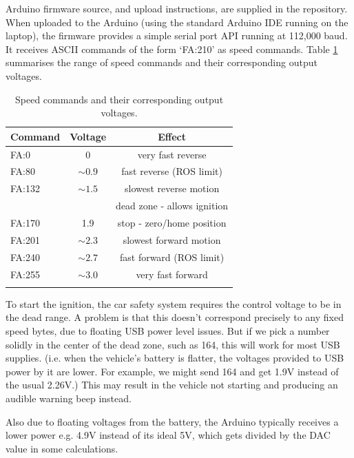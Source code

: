 \documentclass[a4paper]{article}
\begin{document}
	Arduino firmware source, and upload instructions, are supplied in the repository. When uploaded to the Arduino (using the standard Arduino IDE running on the laptop), the firmware provides a simple serial port API running at 112,000 baud. It receives ASCII commands of the form `FA:210' as speed commands. Table \ref{tab:speed_commands} summarises the range of speed commands and their corresponding output voltages. 
	
	\begin{table}
		\begin{center}
			\caption{Speed commands and their corresponding output voltages.}
			\label{tab:speed_commands}
			\begin{tabular}{ l c c }
				\hline
				Command   &    Voltage            &  Effect \\
				\hline
				FA:0      &    0                  & very fast reverse  \\
				FA:80     &    $\sim 0.9$         & fast reverse (ROS limit) \\
				FA:132    &   $\sim 1.5$          & slowest reverse motion  \\
				&                       & dead zone - allows ignition \\
				FA:170    &    1.9                & stop - zero/home position \\
				FA:201    &    $\sim 2.3$         & slowest forward motion \\
				FA:240    &    $\sim 2.7$         & fast forward (ROS limit) \\
				FA:255    &    $\sim 3.0$         & very fast forward \\
				\hline\\
			\end{tabular}
		\end{center}    
	\end{table}
	
	To start the ignition, the car safety system requires the control voltage to be in the dead range. A problem is that this doesn’t correspond precisely to any fixed speed bytes, due to floating USB power level issues.  But if we pick a number solidly in the center of the dead zone, such as 164, this will work for most USB supplies. (i.e. when the vehicle’s battery is flatter, the voltages provided to USB power by it are lower. For example, we might send 164 and get 1.9V instead of the usual 2.26V.) This may result in the vehicle not starting and producing an audible warning beep instead.
	
	Also due to floating voltages from the battery, the Arduino typically receives a lower power e.g. 4.9V instead of its ideal 5V, which gets divided by the DAC value in some calculations. 
	
\end{document}

